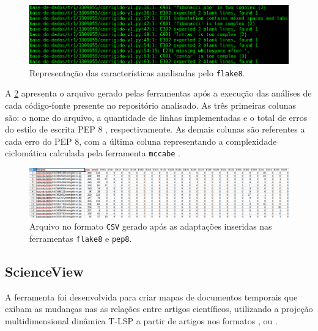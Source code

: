 			\begin{figure}[h]
				\centering
				\includegraphics[width=1\linewidth]{imagem/flake8}
				\caption{Representação das características analisadas pelo \texttt{flake8}.}
				\label{fig:flake8}
			\end{figure}		

			A \cref{fig:arquivoCSV} apresenta o arquivo gerado pelas ferramentas após a
			execução das análises de cada código-fonte presente no repositório analisado.
			As três primeiras colunas são: o nome do arquivo, a quantidade de linhas implementadas
			e o total de erros do estilo de escrita PEP 8 \cite{van2001pep}, respectivamente. As
			demais colunas são referentes a cada erro do PEP 8, com a última
			coluna representando a complexidade ciclomática calculada pela ferramenta
			\texttt{mccabe} \cite{mccabe2013}.

			\begin{figure}[h]
				\centering
				\includegraphics[width=1\linewidth]{imagem/arquivoCSV}
				\caption{Arquivo no formato \texttt{CSV} gerado após as adaptações inseridas nas ferramentas \texttt{flake8} e \texttt{pep8}.}
				\label{fig:arquivoCSV}
			\end{figure}
		

		\subsection{ScienceView}
		\label{sec:scienceView}
		
		A ferramenta  \cite{Alencar} foi desenvolvida para criar
		mapas de documentos temporais que exibam as mudanças nas as relações entre
		artigos científicos, utilizando a projeção multidimensional dinâmica \acs{T-LSP}
		a partir de artigos nos formatos , 
		ou .
		
